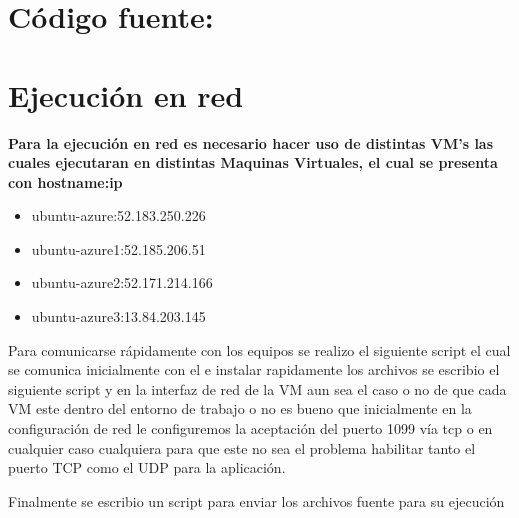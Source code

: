 \documentclass[10pt,executivepaper]{article}
\begin{document}
\section{Código fuente:}
\begin{center}
  
  
  
  
  
\end{center}
\section{Ejecución en red}
\textbf{Para la ejecución en red es necesario hacer uso de distintas VM's las cuales ejecutaran en distintas Maquinas Virtuales, el cual se presenta con hostname:ip}\\

\begin{itemize}
  \item ubuntu-azure:52.183.250.226
  \item ubuntu-azure1:52.185.206.51
  \item ubuntu-azure2:52.171.214.166
  \item ubuntu-azure3:13.84.203.145
\end{itemize}
Para comunicarse rápidamente con los equipos se realizo el siguiente script el cual se comunica inicialmente con el e instalar rapidamente los archivos se escribio el siguiente script y en la interfaz de red de la VM aun sea el caso o no de que cada VM este dentro del entorno de trabajo o no es bueno que inicialmente en la configuración de red le configuremos la aceptación del puerto 1099 vía tcp o en cualquier caso cualquiera para que este no sea el problema habilitar tanto el puerto TCP como el UDP para la aplicación.
\begin{center}
  
\end{center}
Finalmente se escribio un script para enviar los archivos fuente para su ejecución
\begin{center}
  
\end{center}
\end{document}
